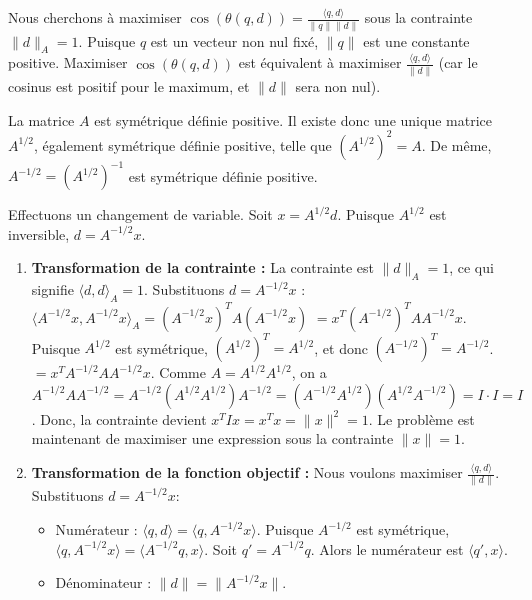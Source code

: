 \documentclass[11pt,a4paper]{report}
\begin{document}
Nous cherchons à maximiser
\(\cos(\theta(q,d)) = \frac{\langle q, d \rangle}{\|q\| \|d\|}\) sous la
contrainte \(\|d\|_A = 1\). Puisque \(q\) est un vecteur non nul fixé,
\(\|q\|\) est une constante positive. Maximiser \(\cos(\theta(q,d))\)
est équivalent à maximiser \(\frac{\langle q, d \rangle}{\|d\|}\) (car
le cosinus est positif pour le maximum, et \(\|d\|\) sera non nul).

La matrice \(A\) est symétrique définie positive. Il existe donc une
unique matrice \(A^{1/2}\), également symétrique définie positive, telle
que \((A^{1/2})^2 = A\). De même, \(A^{-1/2} = (A^{1/2})^{-1}\) est
symétrique définie positive.

Effectuons un changement de variable. Soit \(x = A^{1/2} d\). Puisque
\(A^{1/2}\) est inversible, \(d = A^{-1/2} x\).

\begin{enumerate}
\def\labelenumi{\arabic{enumi}.}
\item
  \textbf{Transformation de la contrainte :} La contrainte est
  \(\|d\|_A = 1\), ce qui signifie \(\langle d, d \rangle_A = 1\).
  Substituons \(d = A^{-1/2} x\) :
  \(\langle A^{-1/2} x, A^{-1/2} x \rangle_A = (A^{-1/2} x)^T A (A^{-1/2} x)\)
  \(= x^T (A^{-1/2})^T A A^{-1/2} x\). Puisque \(A^{1/2}\) est
  symétrique, \((A^{1/2})^T = A^{1/2}\), et donc
  \((A^{-1/2})^T = A^{-1/2}\). \(= x^T A^{-1/2} A A^{-1/2} x\). Comme
  \(A = A^{1/2} A^{1/2}\), on a
  \(A^{-1/2} A A^{-1/2} = A^{-1/2} (A^{1/2} A^{1/2}) A^{-1/2} = (A^{-1/2} A^{1/2}) (A^{1/2} A^{-1/2}) = I \cdot I = I\).
  Donc, la contrainte devient \(x^T I x = x^T x = \|x\|^2 = 1\). Le
  problème est maintenant de maximiser une expression sous la contrainte
  \(\|x\|=1\).
\item
  \textbf{Transformation de la fonction objectif :} Nous voulons
  maximiser \(\frac{\langle q, d \rangle}{\|d\|}\). Substituons
  \(d = A^{-1/2} x\):

  \begin{itemize}

  \item
    Numérateur :
    \(\langle q, d \rangle = \langle q, A^{-1/2} x \rangle\). Puisque
    \(A^{-1/2}\) est symétrique,
    \(\langle q, A^{-1/2} x \rangle = \langle A^{-1/2} q, x \rangle\).
    Soit \(q' = A^{-1/2} q\). Alors le numérateur est
    \(\langle q', x \rangle\).
  \item
    Dénominateur : \(\|d\| = \|A^{-1/2} x\|\).
  \end{itemize}


\end{enumerate}
\end{document}
